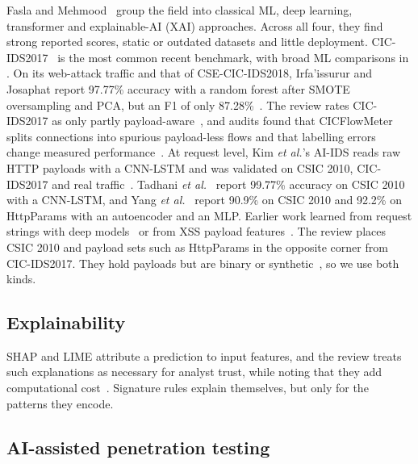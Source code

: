 \documentclass[conference]{IEEEtran}
\begin{document}
Fasla and Mehmood~\cite{fasla2026} group the field into classical ML, deep learning, transformer and explainable-AI (XAI) approaches. Across all four, they find strong reported scores, static or outdated datasets and little deployment. CIC-IDS2017~\cite{sharafaldin2018} is the most common recent benchmark, with broad ML comparisons in \cite{maseer2021,kurniabudi2020}. On its web-attack traffic and that of CSE-CIC-IDS2018, Irfa'issurur and Josaphat report 97.77\% accuracy with a random forest after SMOTE oversampling and PCA, but an F1 of only 87.28\%~\cite{irfaissurur2025}. The review rates CIC-IDS2017 as only partly payload-aware~\cite{fasla2026}, and audits found that CICFlowMeter splits connections into spurious payload-less flows and that labelling errors change measured performance~\cite{engelen2021,lanvin2023}. At request level, Kim \emph{et al.}'s AI-IDS reads raw HTTP payloads with a CNN-LSTM and was validated on CSIC 2010, CIC-IDS2017 and real traffic~\cite{kim2020}. Tadhani \emph{et al.}~\cite{tadhani2024} report 99.77\% accuracy on CSIC 2010 with a CNN-LSTM, and Yang \emph{et al.}~\cite{yang2025} report 90.9\% on CSIC 2010 and 92.2\% on HttpParams with an autoencoder and an MLP. Earlier work learned from request strings with deep models~\cite{liang2017} or from XSS payload features~\cite{mereani2018}. The review places CSIC 2010 and payload sets such as HttpParams in the opposite corner from CIC-IDS2017. They hold payloads but are binary or synthetic~\cite{fasla2026}, so we use both kinds.

\subsection{Explainability}

SHAP and LIME attribute a prediction to input features, and the review treats such explanations as necessary for analyst trust, while noting that they add computational cost~\cite{fasla2026}. Signature rules explain themselves, but only for the patterns they encode.

\subsection{AI-assisted penetration testing}
\end{document}
